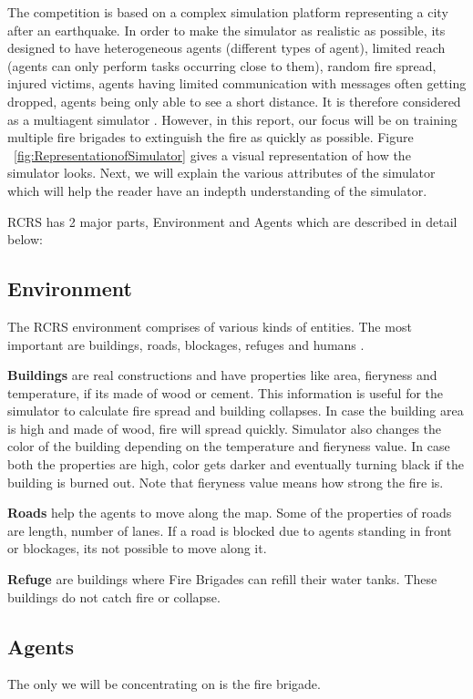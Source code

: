 \documentclass[12pt]{report}
\begin{document}
The competition is based on a complex simulation platform representing a city after an earthquake. In order to make the simulator as realistic as possible, its designed to have heterogeneous agents (different types of agent), limited reach (agents can only perform tasks occurring close to them), random fire spread, injured victims, agents having limited communication with messages often getting dropped, agents being only able to see a short distance. It is therefore considered as a multiagent simulator \cite{Kitano}. However, in this report, our focus will be on training multiple fire brigades to extinguish the fire as quickly as possible.  Figure ~\ref{fig:RepresentationofSimulator} gives a visual representation of how the simulator looks. Next, we will explain the various attributes of the simulator which will help the reader have an indepth understanding of the simulator. 

RCRS has 2 major parts, Environment and Agents which are described in detail below:

\subsection{Environment}

The RCRS environment comprises of various kinds of entities. The most important are buildings, roads, blockages, refuges and humans \cite{Morimoto}. 


\textbf{Buildings} are real constructions and have properties like area, fieryness and temperature, if its made of wood or cement. This information is useful for the simulator to calculate fire spread and building collapses. In case the building area is high and made of wood, fire will spread quickly. Simulator also changes the color of the building depending on the temperature and fieryness value. In case both the properties are high, color gets darker and eventually turning black if the building is burned out. Note that fieryness value means how strong the fire is. 

\textbf{Roads} help the agents to move along the map. Some of the properties of roads are length, number of lanes. If a road is blocked due to agents standing in front or blockages, its not possible to move along it. 

\textbf{Refuge} are buildings where Fire Brigades can refill their water tanks. These buildings do not catch fire or collapse. 

\subsection{Agents} The only we will be concentrating on is the fire brigade. 
\end{document}
